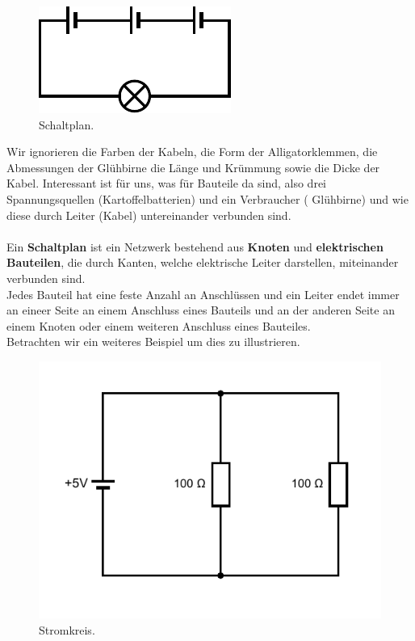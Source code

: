 \documentclass[11pt,a4paper,leqno]{report}
\numberwithin{equation}{chapter}
\begin{document}
\begin{figure}[H]
	\begin{center}
		\includegraphics[scale=1]{Bilder/kartoffel_diagram.pdf}
		\caption{Schaltplan.}
	\end{center}
\end{figure}
\noindent
Wir ignorieren die Farben der Kabeln, die Form der Alligatorklemmen, die Abmessungen der Gl\"uhbirne die L\"ange und Kr\"ummung sowie die Dicke der Kabel. Interessant ist f\"ur uns, was f\"ur Bauteile da sind, also drei Spannungsquellen (Kartoffelbatterien) und ein Verbraucher ( Gl\"uhbirne) und wie diese durch Leiter (Kabel) untereinander verbunden sind.\\
\\
Ein \textbf{Schaltplan} ist ein Netzwerk bestehend aus \textbf{Knoten} und \textbf{elektrischen Bauteilen}, die durch Kanten, welche elektrische Leiter darstellen, miteinander verbunden sind.\\
Jedes Bauteil hat eine feste Anzahl an Anschl\"ussen und ein Leiter endet immer an eineer Seite an einem Anschluss eines Bauteils und an der anderen Seite an einem Knoten oder einem weiteren Anschluss eines Bauteiles.\\
Betrachten wir ein weiteres Beispiel um dies zu illustrieren. 
\begin{figure}[H]
	\begin{center}
		\includegraphics[scale=0.6]{Bilder/circuit.pdf}
		\caption{Stromkreis.}
	\end{center}
\end{figure}
\end{document}
